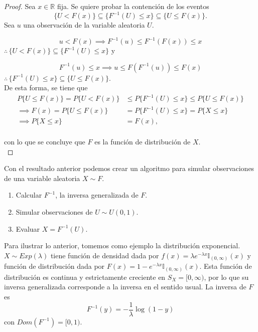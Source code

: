 \documentclass[11pt,a4paper]{article}
\begin{document}
\begin{proof}
Sea $x\in \mathbb{R}$ fija. Se quiere probar la contención de los eventos $$\{U<F(x)\}\subseteq\{F^{-1}(U)\leq x\}\subseteq\{U\leq F(x)\}.$$ Sea $u$ una observación de la variable aleatoria $U$.

$$u<F(x) \implies F^{-1}(u) \leq F^{-1}(F(x)) \leq x$$
$\therefore \hspace{2pt} \{U<F(x)\} \subseteq\{F^{-1}(U)\leq x\}$ y


$$F^{-1}(u)\leq x \implies u\leq F(F^{-1}(u))\leq F(x)$$
$\therefore \hspace{2pt} \{F^{-1}(U)\leq x\}\subseteq \{U \leq F(x)\}$.\\

De esta forma, se tiene que 
\begin{align*}
P\{U\leq F(x)\} = P\{U<F(x)\} &\leq P\{F^{-1}(U)\leq x\} \leq P\{U \leq F(x)\}\\
\implies F(x) = P\{U \leq F(x)\} &= P\{F^{-1}(U)\leq x\} = P\{X\leq x\}\\
\implies P\{X \leq x\} &= F(x),\\
\end{align*}

con lo que se concluye que $F$ es la función de distribución de $X$.\\
\end{proof}

Con el resultado anterior podemos crear un algoritmo para simular observaciones de una variable aleatoria $X\sim F$.

\begin{enumerate}
\item Calcular $F^{-1}$, la inversa generalizada de $F$.
\item Simular observaciones de $U\sim U(0,1)$.
\item Evaluar $X=F^{-1}(U)$.\\ 
\end{enumerate}

Para ilustrar lo anterior, tomemos como ejemplo la distribución exponencial. $X\sim Exp(\lambda)$ tiene función de densidad dada por $f(x) = \lambda e^{-\lambda x} \mathbb{I}_{(0,\infty)}(x)$ y función de distribución dada por $F(x) = 1-e^{-\lambda x}\mathbb{I}_{(0,\infty)}(x)$. Esta función de distribución es continua y estrictamente creciente en $S_X=[0, \infty)$, por lo que su inversa generalizada corresponde a la inversa en el sentido usual. La inversa de $F$ es $$F^{-1}(y) = -\frac{1}{\lambda}\log (1-y)$$ con $Dom(F^{-1}) = [0, 1)$.\\
\end{document}
